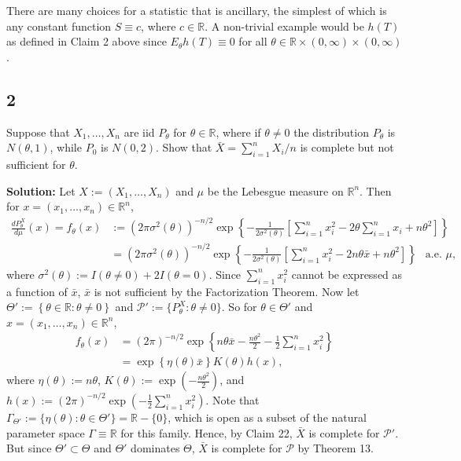 \documentclass[12pt]{article}
\begin{document}
There are many choices for a statistic that is ancillary, the simplest of which is any constant function $S \equiv c$, where $c \in \mathbb{R}$.
A non-trivial example would be $h(T)$ as defined in Claim 2 above since $E_{\theta}h(T) \equiv 0$ for all $\theta \in
\mathbb{R}\times(0,\infty)\times(0,\infty)$.


\newpage
\subsection*{2}
\begin{tcolorbox}
Suppose that $X_1,\ldots,X_n$ are iid $P_\theta$ for $\theta \in \mathbb{R}$, where if $\theta \neq 0$ the distribution $P_\theta$ is $N(\theta,1)$, while $P_0$ is $N(0,2)$.  Show that $\bar{X}=\sum_{i=1}^n X_i/n$ is complete but not sufficient for $\theta$.
\end{tcolorbox}
\textbf{Solution:} Let $X := (X_1, \dots, X_n)$ and $\mu$ be the Lebesgue measure on $\mathbb{R}^{n}$. Then for $x = (x_1, \dots, x_n) \in
\mathbb{R}^{n}$,
\begin{align*}
  \frac{dP_{\theta}^{X}}{d\mu}(x) = f_{\theta}(x) & := \left(2\pi \sigma^{2}(\theta)\right)^{-n/2} \exp\left\{ -\frac{1}{2\sigma^{2}(\theta)}
  \left[ \sum_{i=1}^{n}x_{i}^{2} - 2\theta \sum_{i=1}^{n}x_{i} + n\theta^{2} \right]\right\} \\
  & = \left(2\pi \sigma^{2}(\theta)\right)^{-n/2} \exp\left\{ -\frac{1}{2\sigma^{2}(\theta)}
  \left[ \sum_{i=1}^{n}x_{i}^{2} - 2n\theta \bar{x} + n\theta^{2} \right]\right\} \ \ \text{ a.e. } \mu,
\end{align*}
where $\sigma^{2}(\theta) := I(\theta \neq 0) + 2I(\theta = 0)$. Since $\sum_{i=1}^{n}x_{i}^{2}$ cannot be expressed as a function of $\bar{x}$,
$\bar{x}$ is not sufficient by the Factorization Theorem. Now let $\Theta' := \left\{ \theta \in \mathbb{R} : \theta \neq 0 \right\}$ and
$\mathcal{P}' := \{P_{\theta}^{X} : \theta\neq 0\}$.
So for $\theta \in \Theta'$ and $x = (x_1, \dots, x_n) \in \mathbb{R}^{n}$,
\begin{align*}
  f_{\theta}(x) & = (2\pi)^{-n/2}\exp\left\{ n\theta\bar{x} - \frac{n\theta^{2}}{2} - \frac{1}{2}\sum_{i=1}^{n}x_{i}^{2}  \right\} \\
  & = \exp\left\{ \eta(\theta)\bar{x} \right\}K(\theta)h(x),
\end{align*}
where $\eta(\theta) := n\theta$, $K(\theta) := \exp\left( -\frac{n\theta^2}{2} \right)$, and $h(x) := (2\pi)^{-n/2}\exp\left(
-\frac{1}{2}\sum_{i=1}^{n}x_{i}^{2} \right)$. Note that $\Gamma_{\Theta'} := \{ \eta(\theta) : \theta \in \Theta'\} = \mathbb{R} - \{0\}$, which is
open as a subset of the natural parameter space $\Gamma \equiv \mathbb{R}$ for this family.
Hence, by Claim 22, $\bar{X}$ is complete for $\mathcal{P}'$. But since $\Theta' \subset \Theta$ and $\Theta'$ dominates $\Theta$, $\bar{X}$ is
complete for $\mathcal{P}$ by Theorem 13.
\end{document}
